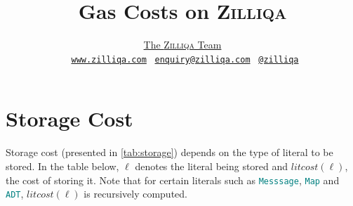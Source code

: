 \documentclass[9pt]{article}
\begin{document}
\title{\vspace{-2cm}
 \textbf{Gas Costs on \textsc{Zilliqa}}}

\author{
 	\href{https://www.zilliqa.com/team.html}{The \textsc{Zilliqa} Team} \\
    \Mundus~\href{https://www.zilliqa.com}{\texttt{www.zilliqa.com}}
\Letter~\href{mailto:enquiry@zilliqa.com}{\texttt{enquiry@zilliqa.com}}
\faTwitter~\href{https://twitter.com/zilliqa}{\texttt{@zilliqa}
}}


\maketitle

\section{Storage Cost}

Storage cost (presented in \autoref{tab:storage}) depends on the type of
literal to be stored. In the table below, $\ell$ denotes the literal being
stored and $litcost(\ell)$, the cost of storing it. Note that for certain
literals such as \texttt{\textcolor{teal}{Messsage}},
\texttt{\textcolor{teal}{Map}} and \texttt{\textcolor{teal}{ADT}},
$litcost(\ell)$ is recursively computed. 
\end{document}
